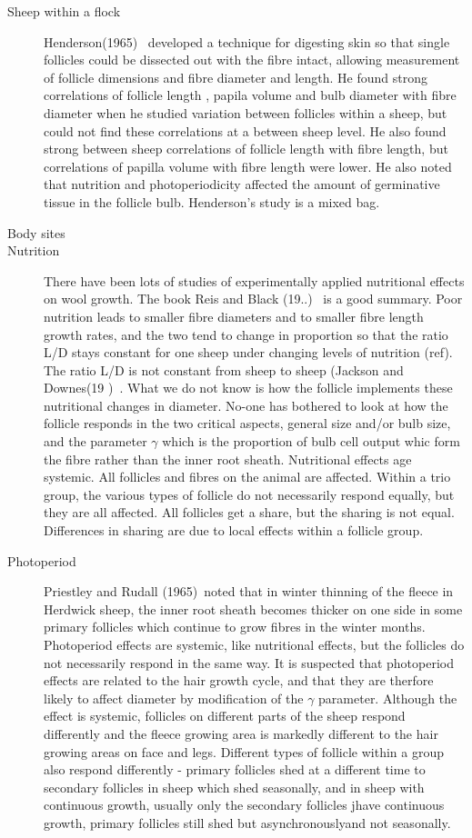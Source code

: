 \documentclass[titlepage]{article}  %
\begin{document}
\begin{description}
\item[Sheep within a flock] Henderson(1965)~\cite{hend:65} developed a technique for digesting skin so that single follicles could be dissected out with the fibre intact, allowing measurement of follicle dimensions and fibre diameter and length. He found strong correlations of follicle length , papila volume and bulb diameter with fibre diameter when he studied variation between follicles within a sheep, but could not find these correlations at a between sheep level. He also found strong between sheep correlations of follicle length with fibre length, but correlations of papilla volume with fibre length were lower.  He also noted that nutrition and photoperiodicity affected the amount of germinative tissue in the follicle bulb. Henderson's study is a mixed bag.
\item[Body sites]
\item[Nutrition]
There have been lots of studies of experimentally applied nutritional effects on wool growth. 
The book Reis and Black (19..)~\cite{} is a good summary.
Poor nutrition leads to smaller fibre diameters and to smaller fibre length growth rates, and the two tend to change in proportion so that the ratio L/D stays constant for one sheep under changing levels of nutrition (ref). The ratio L/D is not constant from sheep to sheep (Jackson and Downes(19  )~\cite{jack:}.
What we do not know is how the follicle implements these nutritional changes in diameter. No-one has bothered to look at how the follicle responds in the two critical aspects, general size and/or bulb size, and the parameter $\gamma$ which is the proportion of bulb cell output whic form the fibre rather than the inner root sheath.
Nutritional effects age systemic. All follicles and fibres on the animal are affected. Within a trio group, the various types of follicle do not necessarily respond equally, but they are all affected. All follicles get a share, but the sharing is not equal. Differences in sharing are due to local effects within a follicle group.
\item[Photoperiod] Priestley and Rudall (1965)~\cite{prie:65}noted that in winter thinning of the fleece in Herdwick sheep, the inner root sheath becomes thicker on one side in some primary follicles which continue to grow fibres in the winter months.
Photoperiod effects are systemic, like nutritional effects, but the follicles do not necessarily respond in the same way. It is suspected that photoperiod effects are related to the hair growth cycle,  and that they are therfore likely to affect diameter by modification of the $\gamma$ parameter. Although the effect is systemic, follicles on different parts of the sheep respond differently and the fleece growing area is markedly different to the hair growing areas on face and legs. Different types of follicle within a group also respond differently - primary follicles shed at a different time to secondary follicles in sheep which shed seasonally, and in sheep with continuous growth, usually only the secondary follicles jhave continuous growth, primary follicles still shed but asynchronouslyand not seasonally.

\end{description}
\end{document}
